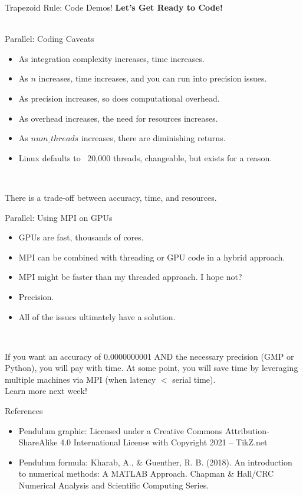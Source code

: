 \documentclass[t]{beamer}
\begin{document}
\begin{frame}{Trapezoid Rule: Code Demos!}
\center
\Large\textbf{Let's Get Ready to Code!} \\ \, \\

\end{frame}

\begin{frame}{Parallel: Coding Caveats}
	\begin{itemize}
		\item As integration complexity increases, time increases.
		\item As $n$ increases, time increases, and you can run into precision issues.
		\item As precision increases, so does computational overhead.
		\item As overhead increases, the need for resources increases.
		\item As $num\_threads$ increases, there are diminishing returns.
		\item Linux defaults to ~20,000 threads, changeable, but exists for a reason.
	\end{itemize} \,

	\center
	\hspace{-1em}There is a trade-off between accuracy, time, and resources.
\end{frame}

\begin{frame}{Parallel: Using MPI on GPUs}
	\begin{itemize}
		\item GPUs are fast, thousands of cores.
		\item MPI can be combined with threading or GPU code in a hybrid approach.
		\item MPI might be faster than my threaded approach.  I hope not?
		\item Precision.
		\item All of the issues ultimately have a solution.
	\end{itemize} \,

	If you want an accuracy of 0.0000000001 AND the necessary precision (GMP or Python),
	you will pay with time. At some point, you will save time by leveraging multiple
	machines via MPI (when latency $<$ serial time). \\

	\center
	Learn more next week!

\end{frame}


\begin{frame}{References}
\begin{itemize}
    \item Pendulum graphic: Licensed under a Creative Commons Attribution-ShareAlike 4.0 International License with Copyright 2021 – TikZ.net
    \item Pendulum formula: Kharab, A., \& Guenther, R. B. (2018). An introduction to numerical methods: A MATLAB Approach. Chapman \& Hall/CRC Numerical Analysis and Scientific Computing Series.
\end{itemize}
\end{frame}
\end{document}
